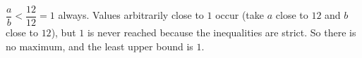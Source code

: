 $\dfrac ab<\dfrac{12}{12}=1$ always. Values arbitrarily close to $1$ occur (take $a$ close to $12$ and $b$ close to $12$), but $1$ is never reached because the inequalities are strict. So there is $\boxed{\text{no maximum}}$, and the least upper bound is $\boxed{1}$.
